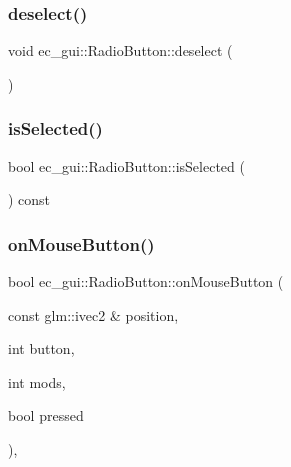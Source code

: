 \subsubsection{\texorpdfstring{deselect()}{deselect()}}
{\footnotesize\ttfamily void ec\+\_\+gui\+::\+Radio\+Button\+::deselect (\begin{DoxyParamCaption}{ }\end{DoxyParamCaption})\hspace{0.3cm}{\ttfamily [protected]}}

\mbox{\label{classec__gui_1_1_radio_button_ae957ec25f29430e229324e2f1fd40938}} 
\subsubsection{\texorpdfstring{is\+Selected()}{isSelected()}}
{\footnotesize\ttfamily bool ec\+\_\+gui\+::\+Radio\+Button\+::is\+Selected (\begin{DoxyParamCaption}{ }\end{DoxyParamCaption}) const}

\mbox{\label{classec__gui_1_1_radio_button_a1292737d957e5cd5ff445bb43ea6911c}} 
\subsubsection{\texorpdfstring{on\+Mouse\+Button()}{onMouseButton()}}
{\footnotesize\ttfamily bool ec\+\_\+gui\+::\+Radio\+Button\+::on\+Mouse\+Button (\begin{DoxyParamCaption}\item[{const glm\+::ivec2 \&}]{position,  }\item[{int}]{button,  }\item[{int}]{mods,  }\item[{bool}]{pressed }\end{DoxyParamCaption})\hspace{0.3cm}{\ttfamily [override]}, {\ttfamily [virtual]}}



